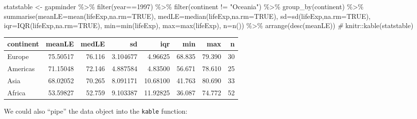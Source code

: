 \documentclass[
]{book}
\newenvironment{Shaded}{\begin{snugshade}}{\end{snugshade}}
\newcommand{\AttributeTok}[1]{\textcolor[rgb]{0.77,0.63,0.00}{#1}}
\newcommand{\CommentTok}[1]{\textcolor[rgb]{0.56,0.35,0.01}{\textit{#1}}}
\newcommand{\ConstantTok}[1]{\textcolor[rgb]{0.00,0.00,0.00}{#1}}
\newcommand{\DecValTok}[1]{\textcolor[rgb]{0.00,0.00,0.81}{#1}}
\newcommand{\FunctionTok}[1]{\textcolor[rgb]{0.00,0.00,0.00}{#1}}
\newcommand{\NormalTok}[1]{#1}
\newcommand{\OtherTok}[1]{\textcolor[rgb]{0.56,0.35,0.01}{#1}}
\newcommand{\SpecialCharTok}[1]{\textcolor[rgb]{0.00,0.00,0.00}{#1}}
\newcommand{\StringTok}[1]{\textcolor[rgb]{0.31,0.60,0.02}{#1}}
\begin{document}
\begin{Shaded}
\begin{Highlighting}[]
\NormalTok{statstable }\OtherTok{\textless{}{-}}\NormalTok{ gapminder }\SpecialCharTok{\%\textgreater{}\%} \FunctionTok{filter}\NormalTok{(year}\SpecialCharTok{==}\DecValTok{1997}\NormalTok{) }\SpecialCharTok{\%\textgreater{}\%} 
  \FunctionTok{filter}\NormalTok{(continent }\SpecialCharTok{!=} \StringTok{"Oceania"}\NormalTok{) }\SpecialCharTok{\%\textgreater{}\%} 
  \FunctionTok{group\_by}\NormalTok{(continent) }\SpecialCharTok{\%\textgreater{}\%} 
  \FunctionTok{summarise}\NormalTok{(}\AttributeTok{meanLE=}\FunctionTok{mean}\NormalTok{(lifeExp,}\AttributeTok{na.rm=}\ConstantTok{TRUE}\NormalTok{),}
            \AttributeTok{medLE=}\FunctionTok{median}\NormalTok{(lifeExp,}\AttributeTok{na.rm=}\ConstantTok{TRUE}\NormalTok{),}
            \AttributeTok{sd=}\FunctionTok{sd}\NormalTok{(lifeExp,}\AttributeTok{na.rm=}\ConstantTok{TRUE}\NormalTok{),}
            \AttributeTok{iqr=}\FunctionTok{IQR}\NormalTok{(lifeExp,}\AttributeTok{na.rm=}\ConstantTok{TRUE}\NormalTok{),}
            \AttributeTok{min=}\FunctionTok{min}\NormalTok{(lifeExp),}
            \AttributeTok{max=}\FunctionTok{max}\NormalTok{(lifeExp),}
            \AttributeTok{n=}\FunctionTok{n}\NormalTok{())  }\SpecialCharTok{\%\textgreater{}\%} 
  \FunctionTok{arrange}\NormalTok{(}\FunctionTok{desc}\NormalTok{(meanLE))}
\CommentTok{\#}
\NormalTok{knitr}\SpecialCharTok{::}\FunctionTok{kable}\NormalTok{(statstable)}
\end{Highlighting}
\end{Shaded}

\begin{tabular}{l|r|r|r|r|r|r|r}
\hline
continent & meanLE & medLE & sd & iqr & min & max & n\\
\hline
Europe & 75.50517 & 76.116 & 3.104677 & 4.96625 & 68.835 & 79.390 & 30\\
\hline
Americas & 71.15048 & 72.146 & 4.887584 & 4.83500 & 56.671 & 78.610 & 25\\
\hline
Asia & 68.02052 & 70.265 & 8.091171 & 10.68100 & 41.763 & 80.690 & 33\\
\hline
Africa & 53.59827 & 52.759 & 9.103387 & 11.92825 & 36.087 & 74.772 & 52\\
\hline
\end{tabular}

We could also ``pipe'' the data object into the \texttt{kable} function:
\end{document}
